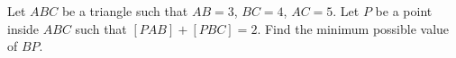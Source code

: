 Let $ABC$ be a triangle such that $AB=3$, $BC=4$, $AC=5$. Let $P$ be a point inside $ABC$ such that $[PAB]+[PBC]=2$. Find the minimum possible value of $BP$.
